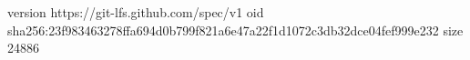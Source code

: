 version https://git-lfs.github.com/spec/v1
oid sha256:23f983463278ffa694d0b799f821a6e47a22f1d1072c3db32dce04fef999e232
size 24886
